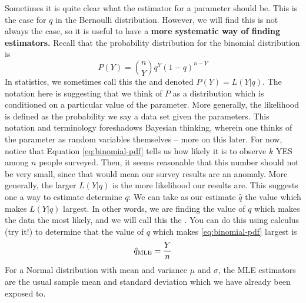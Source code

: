 Sometimes it is quite clear what the estimator for a parameter should be. This is the case for $q$ in the Bernoulli distribution. However, we will find this is not always the case, so it is useful to have a {\bf more systematic way of finding estimators.} 
Recall that the probability distribution for the binomial distribution is 
\begin{equation}\label{eq:binomial-pdf}
P(Y) = {n \choose Y}q^Y(1-q)^{n-Y}
\end{equation}
In statistics, we sometimes call this the  and denoted $P(Y) = L(Y|q)$. The notation here is suggesting that we think of $P$ as a distribution which is conditioned on a particular value of the parameter.  More generally, the likelihood is defined as the probability we say a data set given the parameters. This notation and terminology foreshadows Bayesian thinking, wherein one thinks of the parameter as random variables themselves -- more on this later. 
For now, notice that Equation \eqref{eq:binomial-pdf} tells us how likely it is to observe $k$ YES among $n$ people surveyed. Then, it seems reasonable that this number should not be very small, since that would mean our survey results are an anomaly. More generally, the larger $L(Y|q)$ is the more likelihood our results are. This suggests one a way to estimate determine $q$: We can take as our estimate $\hat{q}$ the value which makes $L(Y|q)$ largest. In other words, we are finding the value of $q$ which makes the data the most likely, and we will call this the .
You can do this using calculus (try it!) to determine that the value of $q$ which makes \eqref{eq:binomial-pdf} largest is \begin{equation*}
\hat{q}_{\rm MLE} = \frac{Y}{n}
\end{equation*}
For a Normal distribution with mean and variance $\mu$ and $\sigma$, the MLE estimators are the usual sample mean and standard deviation which we have already been exposed to. 

